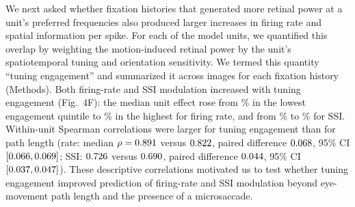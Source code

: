 \documentclass{lite}
\begin{document}
We next asked whether fixation histories that generated more retinal power at a unit’s preferred frequencies also produced larger increases in firing rate and spatial information per spike. For each of the \FigFourUnits{} model units, we quantified this overlap by weighting the motion-induced retinal power by the unit’s spatiotemporal tuning and orientation sensitivity. We termed this quantity “tuning engagement” and summarized it across images for each fixation history (Methods). Both firing-rate and SSI modulation increased with tuning engagement (Fig.~4F): the median unit effect rose from \FigFourRateEngagementLow\% in the lowest engagement quintile to \FigFourRateEngagementHigh\% in the highest for firing rate, and from \FigFourSSIEngagementLow\% to \FigFourSSIEngagementHigh\% for SSI. Within-unit Spearman correlations were larger for tuning engagement than for path length (rate: median $\rho = 0.891$ versus $0.822$, paired difference $0.068$, 95\% CI $[0.066, 0.069]$; SSI: $0.726$ versus $0.690$, paired difference $0.044$, 95\% CI $[0.037, 0.047]$). These descriptive correlations motivated us to test whether tuning engagement improved prediction of firing-rate and SSI modulation beyond eye-movement path length and the presence of a microsaccade.
\end{document}
